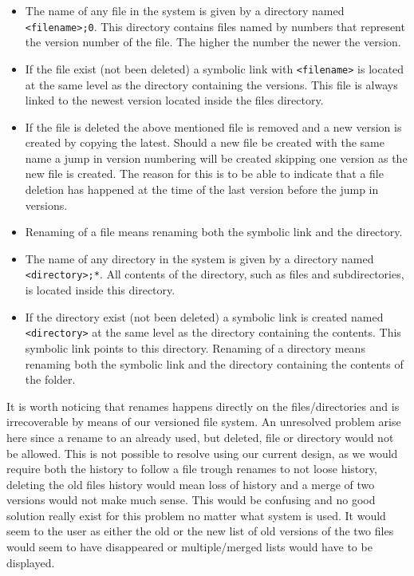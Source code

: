 \documentclass[12pt]{article}
\begin{document}
\begin{itemize}
\item The name of any file in the system is given by a directory named
  \texttt{<filename>;0}. This directory contains files named by numbers that
  represent the version number of the file. The higher the number the
  newer the version.
\item If the file exist (not been deleted) a symbolic link with
  \texttt{<filename>} is located at the same level as the directory
  containing the versions. This file is always linked to the newest version
  located inside the files directory.
\item If the file is deleted the above mentioned file is removed and a
  new version is created by copying the latest. Should a new file be
  created with the same name a jump in version numbering will be
  created skipping one version as the new file is created. The reason
  for this is to be able to indicate that a file deletion has happened
  at the time of the last version before the jump in versions.
\item Renaming of a file means renaming both the symbolic link and the
  directory.
\item The name of any directory in the system is given by a directory
  named \texttt{<directory>;*}. All contents of the directory, such as files
  and subdirectories, is located inside this directory.
\item If the directory exist (not been deleted) a symbolic link is
  created named \texttt{<directory>} at the same level as the directory
  containing the contents. This symbolic link points to this
  directory.  Renaming of a directory means renaming both the symbolic
  link and the directory containing the contents of the folder.
\end{itemize}

It is worth noticing that renames happens directly on the
files/directories and is irrecoverable by means of our versioned file
system. An unresolved problem arise here since a rename to an already
used, but deleted, file or directory would not be allowed. This is not
possible to resolve using our current design, as we would require both
the history to follow a file trough renames to not loose history,
deleting the old files history would mean loss of history and a merge
of two versions would not make much sense. This would be confusing and
no good solution really exist for this problem no matter what system
is used. It would seem to the user as either the old or the new list
of old versions of the two files would seem to have disappeared or
multiple/merged lists would have to be displayed.
\end{document}
